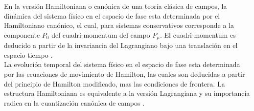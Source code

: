 \documentclass[a4paper,12pt]{article}
\begin{document}
En la versión Hamiltoniana o canónica de una teoría clásica de campos, la dinámica del sistema físico en el espacio de fase esta determinada por el \mbox{Hamiltoniano} canónico, el cual, para sistemas conservativos corresponde a la componente $P_0$ del cuadri-momentum del campo $P_\mu$. El \mbox{cuadri-momentum} es deducido a partir de la invariancia del Lagrangiano bajo una translación en el espacio-tiempo \cite{ noether, greiner, emmy}.
\\

La evolución temporal del sistema físico en el espacio de fase esta \mbox{determinada} por las ecuaciones de movimiento de Hamilton, las cuales son deducidas a partir del principio de Hamilton modificado, mas las condiciones de frontera. La estructura Hamiltoniana es equivalente a la versión Lagrangiana y su importancia radica en la cuantización canónica de campos \cite{general,hamilton,canoalor,tesis}. 
\\
\end{document}
